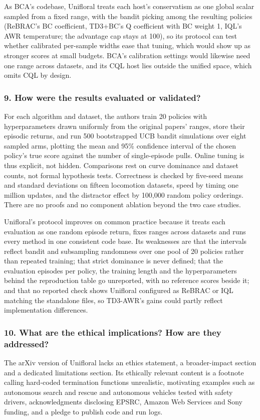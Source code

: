 \documentclass[11pt]{article}
\newcommand{\question}[1]{\subsubsection*{#1}}
\begin{document}
As BCA's codebase, Unifloral treats each host's conservatism as one global scalar sampled from a fixed range, with the bandit picking among the resulting policies (ReBRAC's BC coefficient, TD3+BC's Q coefficient with BC weight 1, IQL's AWR temperature; the advantage cap stays at 100), so its protocol can test whether calibrated per-sample widths ease that tuning, which would show up as stronger scores at small budgets. BCA's calibration settings would likewise need one range across datasets, and its CQL host lies outside the unified space, which omits CQL by design.

\question{9. How were the results evaluated or validated?}

For each algorithm and dataset, the authors train 20 policies with hyperparameters drawn uniformly from the original papers' ranges, store their episodic returns, and run 500 bootstrapped UCB bandit simulations over eight sampled arms, plotting the mean and 95\% confidence interval of the chosen policy's true score against the number of single-episode pulls. Online tuning is thus explicit, not hidden. Comparisons rest on curve dominance and dataset counts, not formal hypothesis tests. Correctness is checked by five-seed means and standard deviations on fifteen locomotion datasets, speed by timing one million updates, and the distractor effect by 100,000 random policy orderings. There are no proofs and no component ablation beyond the two case studies.

Unifloral's protocol improves on common practice because it treats each evaluation as one random episode return, fixes ranges across datasets and runs every method in one consistent code base. Its weaknesses are that the intervals reflect bandit and subsampling randomness over one pool of 20 policies rather than repeated training; that strict dominance is never defined; that the evaluation episodes per policy, the training length and the hyperparameters behind the reproduction table go unreported, with no reference scores beside it; and that no reported check shows Unifloral configured as ReBRAC or IQL matching the standalone files, so TD3-AWR's gains could partly reflect implementation differences.

\question{10. What are the ethical implications? How are they addressed?}

The arXiv version of Unifloral lacks an ethics statement, a broader-impact section and a dedicated limitations section. Its ethically relevant content is a footnote calling hard-coded termination functions unrealistic, motivating examples such as autonomous search and rescue and autonomous vehicles tested with safety drivers, acknowledgments disclosing EPSRC, Amazon Web Services and Sony funding, and a pledge to publish code and run logs.
\end{document}
